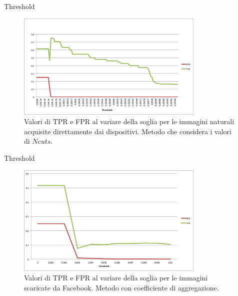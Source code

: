\begin{tframe}{Threshold}

\begin{figure}[h]
\begin{center}
\includegraphics[width=0.8\textwidth]{../images/soglia_imgnat_NC.png}
\end{center}
  \caption{Valori di TPR e FPR al variare della soglia per le immagini naturali acquisite direttamente dai dispositivi. Metodo che considera i valori di $Ncuts$.}
\label{fig:soglia AC}
\end{figure}

\end{tframe}

\begin{tframe}{Threshold}

\begin{figure}[h]
\begin{center}
\includegraphics[width=0.8\textwidth]{../images/soglia_imgnat_fb_AC.png}
\end{center}
  \caption{Valori di TPR e FPR al variare della soglia per le immagini scaricate da Facebook. Metodo con coefficiente di aggregazione.}
\label{fig:soglia AC}
\end{figure}

\end{tframe}

